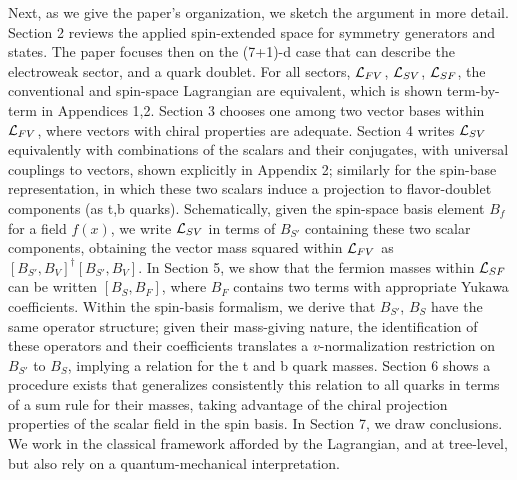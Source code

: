 \documentclass[12pt]{article}
\renewcommand\[{\begin{dmath}}
\renewcommand\]{\end{dmath}}
\begin{document}
Next, as we give the paper's organization,  we sketch the argument in more detail.   Section  2  reviews the applied spin-extended space for symmetry generators  and states.  The paper focuses  then on  the (7+1)-d case  that can describe the electroweak
sector, and a quark doublet. For all sectors, ${\cal L}_{FV}$, ${\cal L}_{SV}$,  $ {\cal L}_{SF}$,
  the  conventional and spin-space Lagrangian  are equivalent, which is shown  term-by-term  in Appendices 1,2.
 Section 3  chooses one among two     vector bases    within ${\cal L}_{FV}$, where vectors with chiral properties are adequate.    Section 4  writes
  ${\cal L}_{SV}$  equivalently  with    combinations  of the scalars   and  their conjugates,  with universal  couplings to  vectors, shown explicitly in Appendix 2;
  similarly for the spin-base representation, in which these two  scalars    induce  a projection  to flavor-doublet components (as t,b  quarks).
Schematically,   given the  spin-space basis element $B_f$ for a field $f(x)$, we  write ${\cal L}_{SV}$    in terms of  $B_{S'}$ containing these two scalar components, obtaining the vector  mass   squared within
    ${\cal L}_{FV}$     as  $[B_{S'},B_V]^\dagger [B_{S'},B_V]$.
      In Section 5, we show
      that  the fermion masses     within  ${\cal L}_{SF}$ can be written $[B_S,B_F] $, where $B_F$ contains two terms  with appropriate  Yukawa coefficients.
     Within the   spin-basis formalism,  we derive that  $B_{S'}$,         $B_{S}$   have the same operator structure;  given their mass-giving nature, the  identification of  these operators  and their coefficients  translates a $v$-normalization restriction   on   $B_{S'}$
to  $B_{S}$,      implying a  relation for the t and b  quark masses. Section 6  shows a  procedure exists that generalizes consistently
 this relation to all quarks in terms of a sum rule for their masses,  taking advantage of the chiral projection properties of the scalar field in the spin basis.
      In   Section 7,  we draw conclusions.
       We work in  the classical framework afforded by the Lagrangian,  and  at tree-level, but  also rely on a quantum-mechanical interpretation.

\end{document}
